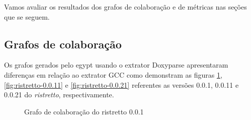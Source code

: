 Vamos avaliar os resultados dos grafos de colaboração e de métricas nas seções
que se seguem.

\subsection{Grafos de colaboração}

Os grafos gerados pelo egypt usando o extrator Doxyparse apresentaram
diferenças em relação ao extrator GCC como demonstram as figuras
\ref{fig:ristretto-0.0.1}, \ref{fig:ristretto-0.0.11} e
\ref{fig:ristretto-0.0.21} referentes as versões 0.0.1, 0.0.11 e 0.0.21 do {\it
ristretto}, respectivamente.

\begin{figure}
\center
{}
\qquad
{}
\caption{Grafo de colaboração do ristretto 0.0.1}
\label{fig:ristretto-0.0.1}
\end{figure}

